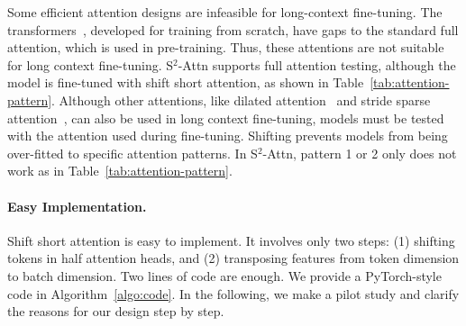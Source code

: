 \documentclass{article} %
\begin{document}
Some efficient attention designs are infeasible for long-context fine-tuning.
The transformers~\citep{block-wise-self-attention,sparse-transformer}, developed for training from scratch, have gaps to the standard full attention, which is used in pre-training. Thus, these attentions are not suitable for long context fine-tuning.
S$^2$-Attn supports full attention testing, although the model is fine-tuned with shift short attention, as shown in Table~\ref{tab:attention-pattern}. Although other attentions, like dilated attention~\citep{longnet} and stride sparse attention~\citep{sparse-transformer}, can also be used in long context fine-tuning, models must be tested with the attention used during fine-tuning. Shifting prevents models from being over-fitted to specific attention patterns. In S$^2$-Attn, pattern 1 or 2 only does not work as in Table~\ref{tab:attention-pattern}.

\paragraph{Easy Implementation.}
Shift short attention is easy to implement. It involves only two steps: (1) shifting tokens in half attention heads, and (2) transposing features from token dimension to batch dimension. Two lines of code are enough. We provide a PyTorch-style code in Algorithm~\ref{algo:code}. In the following, we make a pilot study and clarify the reasons for our design step by step.
\end{document}
